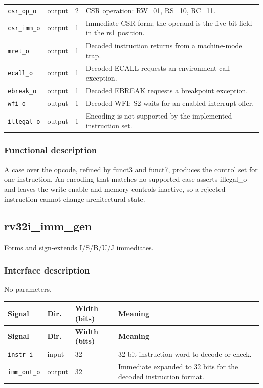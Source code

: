 \documentclass[11pt]{article}
\begin{document}
{\begin{longtable}{@{}L{0.3400\dimexpr\linewidth-36pt\relax}L{0.1000\dimexpr\linewidth-36pt\relax}L{0.1000\dimexpr\linewidth-36pt\relax}L{0.4600\dimexpr\linewidth-36pt\relax}@{}}
\texttt{csr\_op\_o} & output & 2 & CSR operation: RW=01, RS=10, RC=11. \\ \addlinespace[3pt]
\texttt{csr\_imm\_o} & output & 1 & Immediate CSR form; the operand is the five-bit field in the rs1 position. \\ \addlinespace[3pt]
\texttt{mret\_o} & output & 1 & Decoded instruction returns from a machine-mode trap. \\ \addlinespace[3pt]
\texttt{ecall\_o} & output & 1 & Decoded ECALL requests an environment-call exception. \\ \addlinespace[3pt]
\texttt{ebreak\_o} & output & 1 & Decoded EBREAK requests a breakpoint exception. \\ \addlinespace[3pt]
\texttt{wfi\_o} & output & 1 & Decoded WFI; S2 waits for an enabled interrupt offer. \\ \addlinespace[3pt]
\texttt{illegal\_o} & output & 1 & Encoding is not supported by the implemented instruction set. \\*
\bottomrule\end{longtable}}
\subsubsection{Functional description}
\noindent A case over the opcode, refined by funct3 and funct7, produces the control set for one instruction. An encoding that matches no supported case asserts illegal\_o and leaves the write-enable and memory controls inactive, so a rejected instruction cannot change architectural state.\par\medskip

\subsection{rv32i\_imm\_gen}
Forms and sign-extends I/S/B/U/J immediates.
\subsubsection{Interface description}
\noindent No parameters.\par\medskip
{\small
\begin{longtable}{@{}L{0.3400\dimexpr\linewidth-36pt\relax}L{0.1000\dimexpr\linewidth-36pt\relax}L{0.1000\dimexpr\linewidth-36pt\relax}L{0.4600\dimexpr\linewidth-36pt\relax}@{}}
\toprule
\textbf{Signal} & \textbf{Dir.} & \textbf{Width (bits)} & \textbf{Meaning} \\ \midrule
\endfirsthead
\toprule
\textbf{Signal} & \textbf{Dir.} & \textbf{Width (bits)} & \textbf{Meaning} \\ \midrule
\endhead
\texttt{instr\_i} & input & 32 & 32-bit instruction word to decode or check. \\ \addlinespace[3pt]
\texttt{imm\_out\_o} & output & 32 & Immediate expanded to 32 bits for the decoded instruction format. \\*
\bottomrule\end{longtable}}
\end{document}
